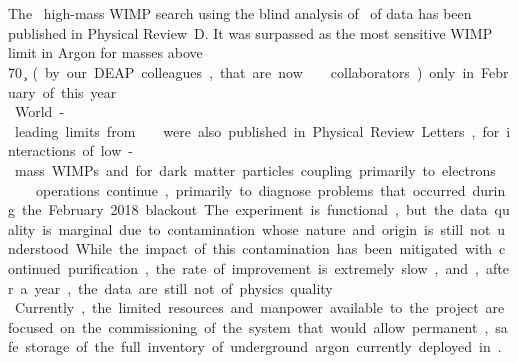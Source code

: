 \section{\DSf}
\label{sec:DSf}

The \DSf\ high-mass WIMP search using the blind analysis of \DSfDdLTPostQualCut\ of data has been published in Physical Review~D.  It was surpassed as the most sensitive WIMP limit in Argon for masses above \SI{70}{\GeV\per\square\c} (by our DEAP colleagues, that are now \DSk\ collaborators) only in February of this year.\\
World-leading limits from \DSf\ were also published in Physical Review Letters, for interactions of  low-mass WIMPs and for dark matter particles coupling primarily to electrons.\\
\DSf\ operations continue, primarily to diagnose problems that occurred during the February 2018 blackout.  The experiment is functional, but the data quality is marginal due to contamination whose nature and origin is still not understood.  While the impact of this contamination has been mitigated with continued purification, the rate of improvement is extremely slow, and, after a year, the data are still not of physics quality.\\
   Currently, the limited resources and manpower available to the project are focused on the commissioning of the system that would allow permanent, safe storage of the full inventory of underground argon currently deployed in \DSf.
